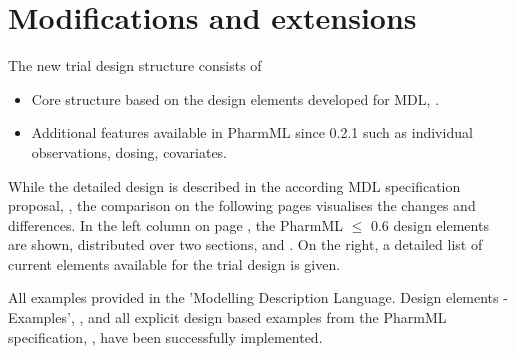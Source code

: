 \section{Modifications and extensions}
The new trial design structure consists of
\begin{itemize}
\item
Core structure based on the design elements developed for MDL, \cite{Commets2015, CommetsExamples2015}.
\item
Additional features available in PharmML since 0.2.1 such as individual 
observations, dosing, covariates.
\end{itemize}
While the detailed design is described in the according MDL specification proposal, 
\cite{Commets2015}, the comparison on the following pages visualises the changes
and differences. In the left column on page \pageref{miniPage:comparison}, the PharmML 
$\leq$ 0.6 design elements are shown, distributed
over two sections,  and . 
On the right, a detailed list of current elements available for the trial design is given.

All examples provided in the 'Modelling Description Language. Design 
elements - Examples', \cite{CommetsExamples2015}, and all explicit design 
based examples from the PharmML specification, \cite{Pharmml_06}, have 
been successfully implemented.

